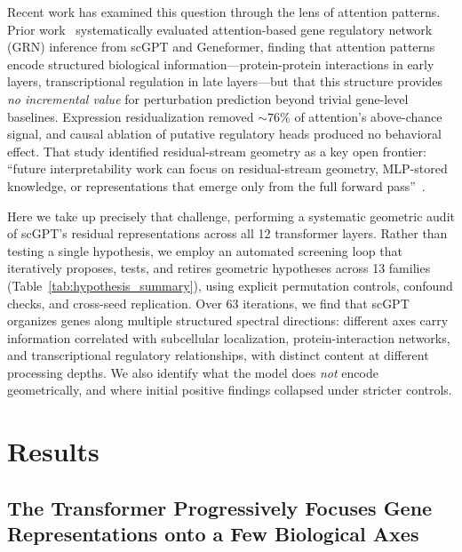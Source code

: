 \documentclass[12pt]{article}
\begin{document}
Recent work has examined this question through the lens of attention patterns.
Prior work~\cite{kendiukhov2026attention} systematically evaluated attention-based gene regulatory network (GRN) inference from scGPT and Geneformer, finding that attention patterns encode structured biological information---protein-protein interactions in early layers, transcriptional regulation in late layers---but that this structure provides \emph{no incremental value} for perturbation prediction beyond trivial gene-level baselines.
Expression residualization removed ${\sim}76\%$ of attention's above-chance signal, and causal ablation of putative regulatory heads produced no behavioral effect.
That study identified residual-stream geometry as a key open frontier: ``future interpretability work can focus on residual-stream geometry, MLP-stored knowledge, or representations that emerge only from the full forward pass''~\cite{kendiukhov2026attention}.

Here we take up precisely that challenge, performing a systematic geometric audit of scGPT's residual representations across all 12 transformer layers.
Rather than testing a single hypothesis, we employ an automated screening loop that iteratively proposes, tests, and retires geometric hypotheses across 13 families (Table~\ref{tab:hypothesis_summary}), using explicit permutation controls, confound checks, and cross-seed replication.
Over 63 iterations, we find that scGPT organizes genes along multiple structured spectral directions: different axes carry information correlated with subcellular localization, protein-interaction networks, and transcriptional regulatory relationships, with distinct content at different processing depths.
We also identify what the model does \emph{not} encode geometrically, and where initial positive findings collapsed under stricter controls.

\section{Results}

\subsection{The Transformer Progressively Focuses Gene Representations onto a Few Biological Axes}
\label{sec:spectral_collapse}
\end{document}
